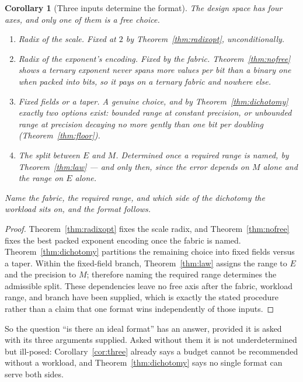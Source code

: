 \documentclass[11pt]{article}
\newtheorem{corollary}{Corollary}
\theoremstyle{definition}
\begin{document}
\begin{corollary}[Three inputs determine the format]
\label{cor:determined}
The design space has four axes, and only one of them is a free choice.
\begin{enumerate}
\item \emph{Radix of the scale.} Fixed at $2$ by Theorem~\ref{thm:radixopt},
unconditionally.
\item \emph{Radix of the exponent's encoding.} Fixed by the fabric.
Theorem~\ref{thm:nofree} shows a ternary exponent never spans more values per bit
than a binary one when packed into bits, so it pays on a ternary fabric and
nowhere else.
\item \emph{Fixed fields or a taper.} A genuine choice, and by
Theorem~\ref{thm:dichotomy} exactly two options exist: bounded range at constant
precision, or unbounded range at precision decaying no more gently than one bit
per doubling (Theorem~\ref{thm:floor}).
\item \emph{The split between $E$ and $M$.} Determined once a required range is
named, by Theorem~\ref{thm:law} --- and \emph{only} then, since the error depends
on $M$ alone and the range on $E$ alone.
\end{enumerate}
Name the fabric, the required range, and which side of the dichotomy the workload
sits on, and the format follows.
\end{corollary}
\begin{proof}
Theorem~\ref{thm:radixopt} fixes the scale radix, and
Theorem~\ref{thm:nofree} fixes the best packed exponent encoding once the
fabric is named.  Theorem~\ref{thm:dichotomy} partitions the remaining choice
into fixed fields versus a taper.  Within the fixed-field branch,
Theorem~\ref{thm:law} assigns the range to $E$ and the precision to $M$;
therefore naming the required range determines the admissible split.  These
dependencies leave no free axis after the fabric, workload range, and branch
have been supplied, which is exactly the stated procedure rather than a claim
that one format wins independently of those inputs.
\end{proof}

So the question ``is there an ideal format'' has an answer, provided it is asked
with its three arguments supplied. Asked without them it is not underdetermined
but ill-posed: Corollary~\ref{cor:three} already says a budget cannot be
recommended without a workload, and Theorem~\ref{thm:dichotomy} says no single
format can serve both sides.
\end{document}
